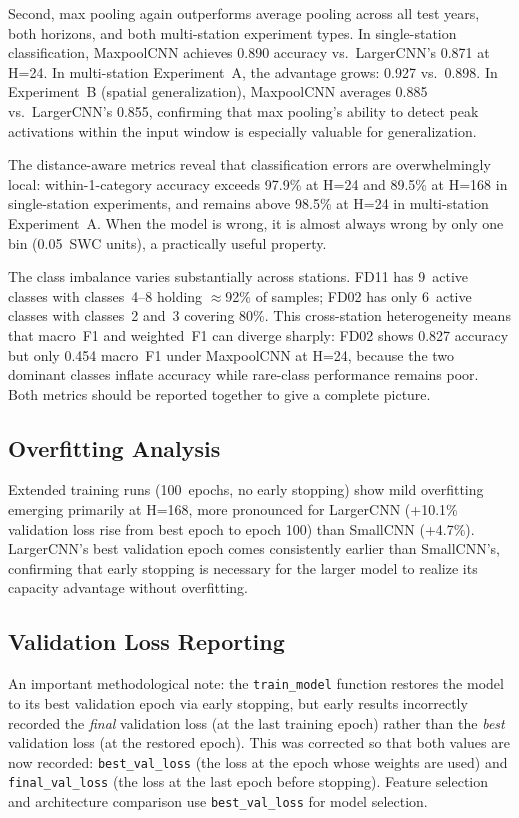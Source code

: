 \documentclass[11pt]{article}
\begin{document}
Second, max pooling again outperforms average pooling across all test years,
both horizons, and both multi-station experiment types. In single-station
classification, MaxpoolCNN achieves 0.890 accuracy vs.\ LargerCNN's 0.871
at H=24. In multi-station Experiment~A, the advantage grows: 0.927 vs.\ 0.898.
In Experiment~B (spatial generalization), MaxpoolCNN averages 0.885 vs.\
LargerCNN's 0.855, confirming that max pooling's ability to detect peak
activations within the input window is especially valuable for generalization.

The distance-aware metrics reveal that classification errors are overwhelmingly
local: within-1-category accuracy exceeds 97.9\% at H=24 and 89.5\% at H=168
in single-station experiments, and remains above 98.5\% at H=24 in multi-station
Experiment~A. When the model is wrong, it is almost always wrong by only one bin
(0.05~SWC units), a practically useful property.

The class imbalance varies substantially across stations. FD11 has 9~active
classes with classes~4--8 holding $\approx$92\% of samples; FD02 has only
6~active classes with classes~2 and~3 covering 80\%. This cross-station
heterogeneity means that macro~F1 and weighted~F1 can diverge sharply:
FD02 shows 0.827 accuracy but only 0.454 macro~F1 under MaxpoolCNN at H=24,
because the two dominant classes inflate accuracy while rare-class performance
remains poor. Both metrics should be reported together to give a complete picture.

\subsection{Overfitting Analysis}

Extended training runs (100~epochs, no early stopping) show mild overfitting
emerging primarily at H=168, more pronounced for LargerCNN (+10.1\% validation loss
rise from best epoch to epoch 100) than SmallCNN (+4.7\%). LargerCNN's best
validation epoch comes consistently earlier than SmallCNN's, confirming that early
stopping is necessary for the larger model to realize its capacity advantage without
overfitting.

\subsection{Validation Loss Reporting}

An important methodological note: the \texttt{train\_model} function restores the
model to its best validation epoch via early stopping, but early results incorrectly
recorded the \emph{final} validation loss (at the last training epoch) rather than
the \emph{best} validation loss (at the restored epoch). This was corrected so that
both values are now recorded: \texttt{best\_val\_loss} (the loss at the epoch whose
weights are used) and \texttt{final\_val\_loss} (the loss at the last epoch before
stopping). Feature selection and architecture comparison use \texttt{best\_val\_loss}
for model selection.
\end{document}
